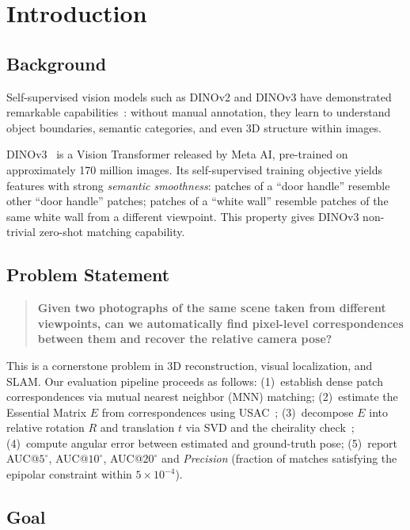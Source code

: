 \documentclass[11pt,a4paper]{article}
\begin{document}
\section{Introduction}

\subsection{Background}

Self-supervised vision models such as DINOv2 and DINOv3 have demonstrated remarkable
capabilities~\cite{dino,dinov2}: without manual annotation, they learn to understand object boundaries,
semantic categories, and even 3D structure within images.

DINOv3~\cite{dinov2,darcet2023registers} is a Vision Transformer released by Meta AI, pre-trained on
approximately 170 million images. Its self-supervised training objective yields features with strong
\emph{semantic smoothness}: patches of a ``door handle'' resemble other ``door handle'' patches; patches
of a ``white wall'' resemble patches of the same white wall from a different viewpoint. This property
gives DINOv3 non-trivial zero-shot matching capability.

\subsection{Problem Statement}

\begin{quote}
\bfseries Given two photographs of the same scene taken from different viewpoints, can we automatically
find pixel-level correspondences between them and recover the relative camera pose?
\end{quote}

This is a cornerstone problem in 3D reconstruction, visual localization, and SLAM. Our evaluation
pipeline proceeds as follows: (1)~establish dense patch correspondences via mutual nearest neighbor
(MNN) matching; (2)~estimate the Essential Matrix $E$ from correspondences using USAC~\cite{usac};
(3)~decompose $E$ into relative rotation $R$ and translation $t$ via SVD and the cheirality
check~\cite{nister2004}; (4)~compute angular error between estimated and ground-truth pose;
(5)~report AUC@$5^\circ$, AUC@$10^\circ$, AUC@$20^\circ$ and \emph{Precision} (fraction of matches
satisfying the epipolar constraint within $5\!\times\!10^{-4}$).

\subsection{Goal}
\end{document}
